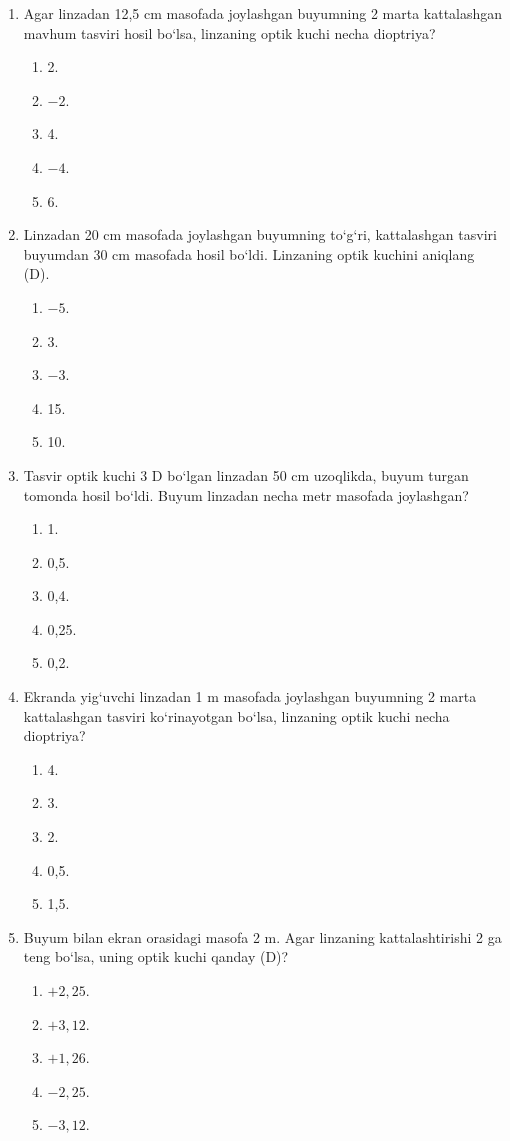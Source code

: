 \begin{enumerate}
\item Agar linzadan 12,5 cm masofada joylashgan buyumning 2 marta kattalashgan mavhum tasviri hosil bo‘lsa, linzaning optik kuchi necha dioptriya?
\begin{enumerate}[label=\Alph*)]
\item 2.
\item $-2$.
\item 4.
\item $-4$.
\item 6.
\end{enumerate}

\item Linzadan 20 cm masofada joylashgan buyumning to‘g‘ri, kattalashgan tasviri buyumdan 30 cm masofada hosil bo‘ldi. Linzaning optik kuchini aniqlang (D).
\begin{enumerate}[label=\Alph*)]
\item $-5$.
\item 3.
\item $-3$.
\item 15.
\item 10.
\end{enumerate}

\item Tasvir optik kuchi 3 D bo‘lgan linzadan 50 cm uzoqlikda, buyum turgan tomonda hosil bo‘ldi. Buyum linzadan necha metr masofada joylashgan?
\begin{enumerate}[label=\Alph*)]
\item 1.
\item 0,5.
\item 0,4.
\item 0,25.
\item 0,2.
\end{enumerate}

\item Ekranda yig‘uvchi linzadan 1 m masofada joylashgan buyumning 2 marta kattalashgan tasviri ko‘rinayotgan bo‘lsa, linzaning optik kuchi necha dioptriya?
\begin{enumerate}[label=\Alph*)]
\item 4.
\item 3.
\item 2.
\item 0,5.
\item 1,5.
\end{enumerate}

\item Buyum bilan ekran orasidagi masofa 2 m. Agar linzaning kattalashtirishi 2 ga teng bo‘lsa, uning optik kuchi qanday (D)?
\begin{enumerate}[label=\Alph*)]
\item $+2{,}25$.
\item $+3{,}12$.
\item $+1{,}26$.
\item $-2{,}25$.
\item $-3{,}12$.
\end{enumerate}


\end{enumerate}
